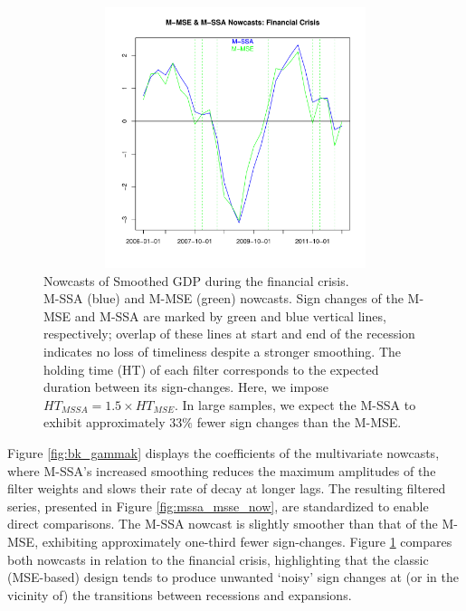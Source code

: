 \documentclass[11pt,a4paper]{article}
\begin{document}
\begin{figure}[H]
    \begin{center}
        \includegraphics[height=3in, width=4.5in]{./Figures/mssa_msse_zc.pdf}
        \caption{Nowcasts of Smoothed GDP during the financial crisis.\\
        M-SSA (blue) and M-MSE (green) nowcasts. 
        Sign changes of the M-MSE and M-SSA are marked by green and blue vertical lines, respectively; overlap of these lines at start and end of the recession indicates no loss of timeliness despite a stronger smoothing.
        The holding time (HT) of each filter corresponds to the expected duration between its sign-changes. 
        Here, we impose  $HT_{MSSA}=1.5\times HT_{MSE}$. In large samples, we expect the M-SSA to exhibit approximately $33\%$ fewer sign changes than the M-MSE.
        \label{fig:mssa_msse_zc}}
    \end{center}
\end{figure}



Figure \ref{fig:bk_gammak} displays the coefficients of the multivariate nowcasts, where M-SSA's increased smoothing reduces the maximum amplitudes of the filter weights and slows their rate of decay at longer lags. The resulting filtered series, presented in Figure \ref{fig:mssa_msse_now}, are standardized to enable direct comparisons. The M-SSA nowcast is slightly smoother than that of the M-MSE, exhibiting approximately one-third fewer sign-changes. Figure \ref{fig:mssa_msse_zc} compares both nowcasts in relation to the financial crisis, highlighting that the classic (MSE-based) design tends to produce unwanted `noisy' sign changes at (or in the vicinity of) the transitions between recessions and expansions. 
\end{document}
